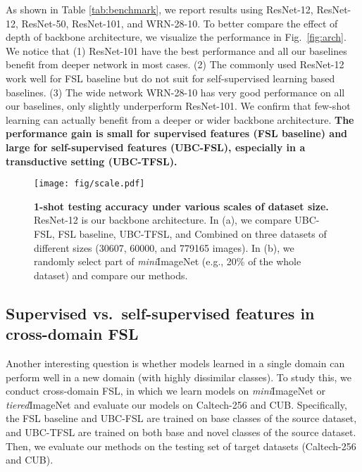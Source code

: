 \documentclass[final]{cvpr}
\newcommand{\subsecvspace}{\vspace{-0.0em}}
\newcommand{\figvspace}{\vspace{-0.2em}}
\newcommand{\captionvspace}{\vspace{-0.1em}}
\begin{document}
As shown in Table \ref{tab:benchmark}, we report results using ResNet-12, ResNet-12, ResNet-50, ResNet-101, and WRN-28-10. To better compare the effect of depth of backbone architecture, we visualize the performance in Fig.~\ref{fig:arch}. We notice that (1) ResNet-101 have the best performance and all our baselines benefit from deeper network in most cases. (2) The commonly used ResNet-12 work well for FSL baseline but do not suit for self-supervised learning based baselines. (3) The wide network WRN-28-10 has very good performance on all our baselines, only slightly underperform ResNet-101.  We confirm that few-shot learning can actually benefit from a deeper or wider backbone architecture. \textbf{The performance gain is small for supervised features (FSL baseline) and large for self-supervised features (UBC-FSL), especially in a transductive setting (UBC-TFSL).} 




















\begin{figure*}[h]
  \centering
  \texttt{[image: fig/scale.pdf]}
  \captionvspace
  \vspace{-0.2cm}
  \caption{\textbf{1-shot testing accuracy under various scales of dataset size.} ResNet-12 is our backbone architecture. In (a), we compare UBC-FSL, FSL baseline, UBC-TFSL, and Combined on three datasets of different sizes (30607, 60000, and 779165 images). In (b), we randomly select part of \emph{mini}ImageNet (e.g., 20\% of the whole dataset) and compare our methods.}
  \label{fig:scale}
  \figvspace
\end{figure*}

\subsecvspace
\subsection{Supervised vs.~self-supervised features in cross-domain FSL}
\subsecvspace

Another interesting question is whether models learned in a single domain can perform well in a new domain (with highly dissimilar classes). To study this, we conduct cross-domain FSL, in which we learn models on \emph{mini}ImageNet or \emph{tiered}ImageNet and evaluate our models on Caltech-256 and CUB. Specifically, the FSL baseline and UBC-FSL are trained on base classes of the source dataset, and UBC-TFSL are trained on both base and novel classes of the source dataset. Then, we evaluate our methods on the testing set of target datasets (Caltech-256 and CUB). 
\end{document}
